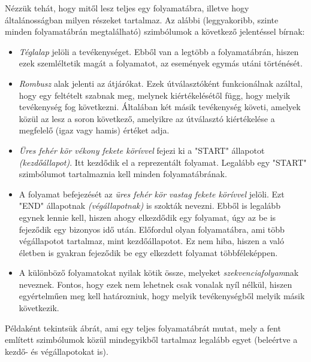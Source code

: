 Nézzük tehát, hogy mitől lesz teljes egy folyamatábra, illetve hogy általánosságban milyen részeket tartalmaz. Az alábbi (leggyakoribb, szinte minden folyamatábrán megtalálható) szimbólumok a következő jelentéssel bírnak:

\begin{itemize}
\item \textit{Téglalap} jelöli a tevékenységet. Ebből van a legtöbb a folyamatábrán, hiszen ezek szemléltetik magát a folyamatot, az események egymás utáni történését.
\item \textit{Rombusz} alak jelenti az átjárókat. Ezek útválasztóként funkcionálnak azáltal, hogy egy feltételt szabnak meg, melynek kiértékelésétől függ, hogy melyik tevékenység fog következni. Általában két másik tevékenység követi, amelyek közül az lesz a soron következő, amelyikre az útválasztó kiértékelése a megfelelő (igaz vagy hamis) értéket adja.
\item \textit{Üres fehér kör vékony fekete körívvel} fejezi ki a "START" állapotot \textit{(kezdőállapot)}. Itt kezdődik el a reprezentált folyamat. Legalább egy "START" szimbólumot tartalmaznia kell minden folyamatábrának.
\item A folyamat befejezését az \textit{üres fehér kör vastag fekete körívvel} jelöli. Ezt "END" állapotnak \textit{(végállapotnak)} is szokták nevezni. Ebből is legalább egynek lennie kell, hiszen ahogy elkezdődik egy folyamat, úgy az be is fejeződik egy bizonyos idő után. Előfordul olyan folyamatábra, ami több végállapotot tartalmaz, mint kezdőállapotot. Ez nem hiba, hiszen a való életben is gyakran fejeződik be egy elkezdett folyamat többféleképpen.
\item A különböző folyamatokat nyilak kötik össze, melyeket \textit{szekvenciafolyam}nak neveznek. Fontos, hogy ezek nem lehetnek csak vonalak nyíl nélkül, hiszen egyértelműen meg kell határozniuk, hogy melyik tevékenységből melyik másik következik.
\end{itemize}

Példaként tekintsük  ábrát, ami egy teljes folyamatábrát mutat, mely a fent említett szimbólumok közül mindegyikből tartalmaz legalább egyet (beleértve a kezdő- és végállapotokat is).

